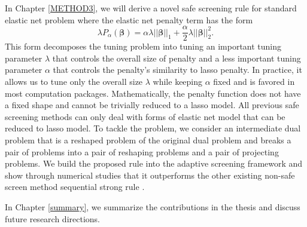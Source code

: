 In Chapter \ref{METHOD3}, we will derive a novel safe screening rule for standard elastic net problem where the elastic net penalty term has the form
\begin{equation}
    \lambda P_\alpha(\boldsymbol\beta)=\alpha \lambda ||\boldsymbol\beta||_1+\frac{\alpha}{2}\lambda||\boldsymbol\beta||_2^2.
\end{equation}
This form decomposes the tuning problem into tuning an important tuning parameter $\lambda$ that controls the overall size of penalty and a less important tuning parameter $\alpha$ that controls the penalty's similarity to lasso penalty. In practice, it allows us to tune only the overall size $\lambda$ while keeping $\alpha$ fixed and is favored in most computation packages. Mathematically, the penalty function does not have a fixed shape and cannot be trivially reduced to a lasso model. All previous safe screening methods can only deal with forms of elastic net model that can be reduced to lasso model. To tackle the problem, we consider an intermediate dual problem that is a reshaped problem of the original dual problem and breaks a pair of problems into a pair of reshaping problems and a pair of projecting problems. We build the proposed rule into the adaptive screening framework and show through numerical studies that it outperforms the other existing non-safe screen method sequential strong rule \citep{Tibshirani2012}.

In Chapter \ref{summary}, we summarize the contributions in the thesis and discuss future research directions.